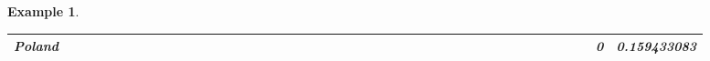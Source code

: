 \documentclass[a4paper,11pt]{report}
\newtheorem{example}[theorem]{Example}
\begin{document}
\begin{example}
\begin{appendices}
\begin{landscape}
\begin{longtable}{r|r|r|r|r|r|r|r|r|r|r|r|r|r|r|r|r|r|r|r|r|r|r|r|r|r|r|r|r|r|r|r|r|r|r|r|r|r|r|r|r|r|r|r|}
\multicolumn{1}{|r|}{\textbf{Poland}}                &                                       &                                       &                                          &                                       &                                       &                                                     &                                        &                                       &                                      &                                       &                                       &                                                &                                       &                                      &                                       &                                       &                                      &                                       &                                       &                                      &                                      &                                         &                                     &                                       &                                      &                                      &                                        &                                       &                                      &                                      &                                        &                                        &                                     &                                      &                                           &                                               &                                      &                                       &                                              &                                      &                                     & 0                                             & 0.159433083                             \\ \hline

\end{longtable}
\end{landscape}
\end{appendices}
\end{example}
\end{document}
